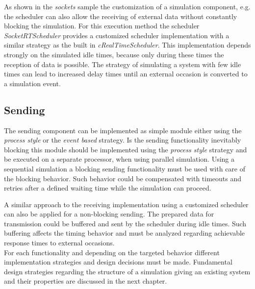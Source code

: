 As shown in the \emph{sockets} sample the customization of a simulation component, e.g. the scheduler can also allow the receiving of external data without constantly blocking the simulation.
For this execution method the scheduler \emph{SocketRTScheduler} provides a customized scheduler implementation with a similar strategy as the built in \emph{cRealTimeScheduler}.
This implementation depends strongly on the simulated idle times, because only during these times the reception of data is possible.
The strategy of simulating a system with few idle times can lead to increased delay times until an external occasion is converted to a simulation event.

\subsection{Sending}
\label{sec:emulation_communication_sending}
The sending component can be implemented as simple module either using the \emph{process style} or the \emph{event based} strategy.
Is the sending functionality inevitably blocking this module should be implemented using the \emph{process style} strategy and be executed on a separate processor, when using parallel simulation.
Using a sequential simulation a blocking sending functionality must be used with care of the blocking behavior.
Such behavior could be compensated with timeouts and retries after a defined waiting time while the simulation can proceed.

A similar approach to the receiving implementation using a customized scheduler can also be applied for a non-blocking sending.
The prepared data for transmission could be buffered and sent by the scheduler during idle times.
Such buffering affects the timing behavior and must be analyzed regarding achievable response times to external occasions.
\\

For each functionality and depending on the targeted behavior different implementation strategies and design decisions must be made.
Fundamental design strategies regarding the structure of a simulation giving an existing system and their properties are discussed in the next chapter.